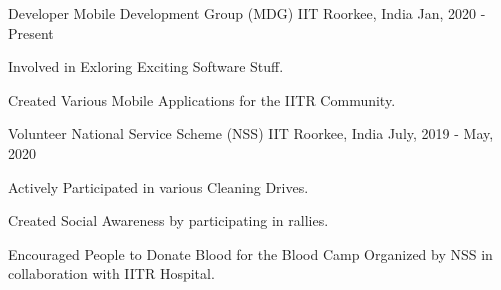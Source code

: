

\begin{cventries}

  \cventry
    {Developer} %
    {Mobile Development Group (MDG)} %
    {IIT Roorkee, India} %
    {Jan, 2020 - Present} %
    {
      \begin{cvitems} %
        \item {Involved in Exloring Exciting Software Stuff.}
        \item {Created Various Mobile Applications for the IITR Community.}
      \end{cvitems}
    }

  \cventry
    {Volunteer} %
    {National Service Scheme (NSS)} %
    {IIT Roorkee, India} %
    {July, 2019 - May, 2020} %
    {
      \begin{cvitems} %
        \item {Actively Participated in various Cleaning Drives.}
        \item {Created Social Awareness by participating in rallies.}
        \item {Encouraged People to Donate Blood for the Blood Camp Organized by NSS in collaboration with IITR Hospital.}
      \end{cvitems}
    }

\end{cventries}